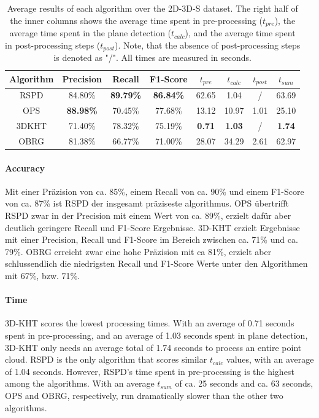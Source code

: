 \documentclass[main.tex]{subfiles}
\begin{document}
\begin{table}[H]
    \centering
    \begin{tabular}{c|cccccc|c}
        Algorithm & Precision        & Recall           & F1-Score         & $t_{pre}$     & $t_{calc}$    & $t_{post}$ & $t_{sum}$     \\ \hline
        RSPD      & 84.80\%          & \textbf{89.79\%} & \textbf{86.84\%} & 62.65         & 1.04          & /          & 63.69         \\
        OPS       & \textbf{88.98\%} & 70.45\%          & 77.68\%          & 13.12         & 10.97         & 1.01       & 25.10         \\
        3DKHT     & 71.40\%          & 78.32\%          & 75.19\%          & \textbf{0.71} & \textbf{1.03} & /          & \textbf{1.74} \\
        OBRG      & 81.38\%          & 66.77\%          & 71.00\%          & 28.07         & 34.29         & 2.61       & 62.97
    \end{tabular}
    \caption[Overall 2D-3D-S Results]{Average results of each algorithm over the 2D-3D-S dataset. The right half of the inner columns shows the average time spent in
        pre-processing ($t_{pre}$), the average time spent in the plane detection ($t_{calc}$), and the average time spent in post-processing steps ($t_{post}$).
        Note, that the absence of post-processing steps is denoted as "/". All times are measured in seconds.}
    \label{tab:res-3d2ds-total}
\end{table}

\paragraph{Accuracy}
Mit einer Präzision von ca. 85\%, einem Recall von ca. 90\% und einem F1-Score von ca. 87\% ist RSPD der insgesamt präziseste algorithmus.
OPS übertrifft RSPD zwar in der Precision mit einem Wert von ca. 89\%, erzielt dafür aber deutlich geringere Recall und F1-Score Ergebnisse.
3D-KHT erzielt Ergebnisse mit einer Precision, Recall und F1-Score im Bereich zwischen ca. 71\% und ca. 79\%.
OBRG erreicht zwar eine hohe Präzision mit ca 81\%, erzielt aber schlussendlich die niedrigsten Recall und F1-Score Werte unter den Algorithmen mit
67\%, bzw. 71\%.

\paragraph{Time}
3D-KHT scores the lowest processing times. With an average of 0.71 seconds spent in pre-processing, and an average of 1.03 seconds spent in plane detection,
3D-KHT only needs an average total of 1.74 seconds to process an entire point cloud. RSPD is the only algorithm that scores similar $t_{calc}$ values, with an
average of 1.04 seconds. However, RSPD's time spent in pre-processing is the highest among the algorithms.
With an average $t_{sum}$ of ca. 25 seconds and ca. 63 seconds, OPS and OBRG, respectively, run dramatically slower than the other two algorithms.
\end{document}
